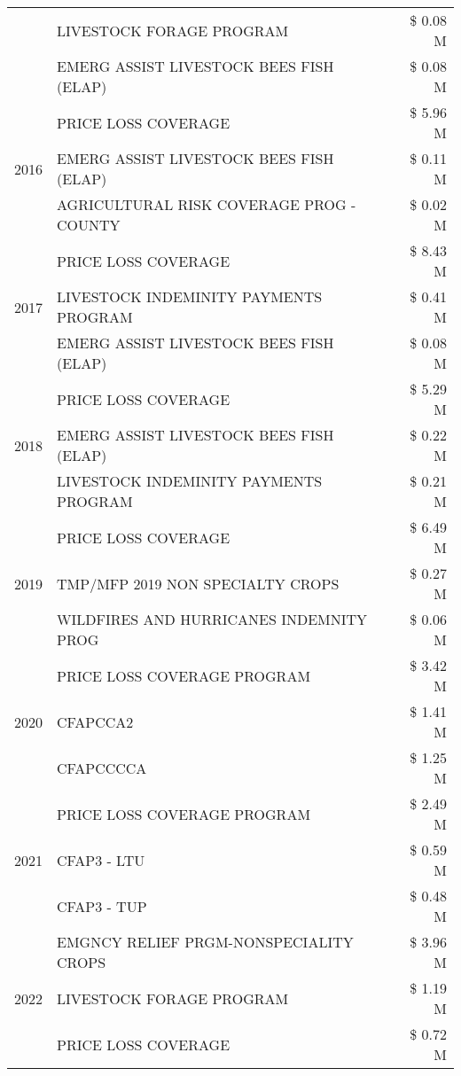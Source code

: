 \begin{tabular}{llr}
 & LIVESTOCK FORAGE PROGRAM & \$ 0.08 M \\
 & EMERG ASSIST LIVESTOCK BEES FISH (ELAP) & \$ 0.08 M \\
\cline{1-3}
\multirow[t]{3}{*}{2016} & PRICE LOSS COVERAGE & \$ 5.96 M \\
 & EMERG ASSIST LIVESTOCK BEES FISH (ELAP) & \$ 0.11 M \\
 & AGRICULTURAL RISK COVERAGE PROG - COUNTY & \$ 0.02 M \\
\cline{1-3}
\multirow[t]{3}{*}{2017} & PRICE LOSS COVERAGE & \$ 8.43 M \\
 & LIVESTOCK INDEMINITY PAYMENTS PROGRAM & \$ 0.41 M \\
 & EMERG ASSIST LIVESTOCK BEES FISH (ELAP) & \$ 0.08 M \\
\cline{1-3}
\multirow[t]{3}{*}{2018} & PRICE LOSS COVERAGE & \$ 5.29 M \\
 & EMERG ASSIST LIVESTOCK BEES FISH (ELAP) & \$ 0.22 M \\
 & LIVESTOCK INDEMINITY PAYMENTS PROGRAM & \$ 0.21 M \\
\cline{1-3}
\multirow[t]{3}{*}{2019} & PRICE LOSS COVERAGE & \$ 6.49 M \\
 & TMP/MFP 2019 NON SPECIALTY CROPS & \$ 0.27 M \\
 & WILDFIRES AND HURRICANES INDEMNITY PROG & \$ 0.06 M \\
\cline{1-3}
\multirow[t]{3}{*}{2020} & PRICE LOSS COVERAGE PROGRAM & \$ 3.42 M \\
 & CFAPCCA2 & \$ 1.41 M \\
 & CFAPCCCCA & \$ 1.25 M \\
\cline{1-3}
\multirow[t]{3}{*}{2021} & PRICE LOSS COVERAGE PROGRAM & \$ 2.49 M \\
 & CFAP3 - LTU & \$ 0.59 M \\
 & CFAP3 - TUP & \$ 0.48 M \\
\cline{1-3}
\multirow[t]{3}{*}{2022} & EMGNCY RELIEF PRGM-NONSPECIALITY CROPS & \$ 3.96 M \\
 & LIVESTOCK FORAGE PROGRAM & \$ 1.19 M \\
 & PRICE LOSS COVERAGE & \$ 0.72 M \\
\cline{1-3}
\bottomrule
\end{tabular}
